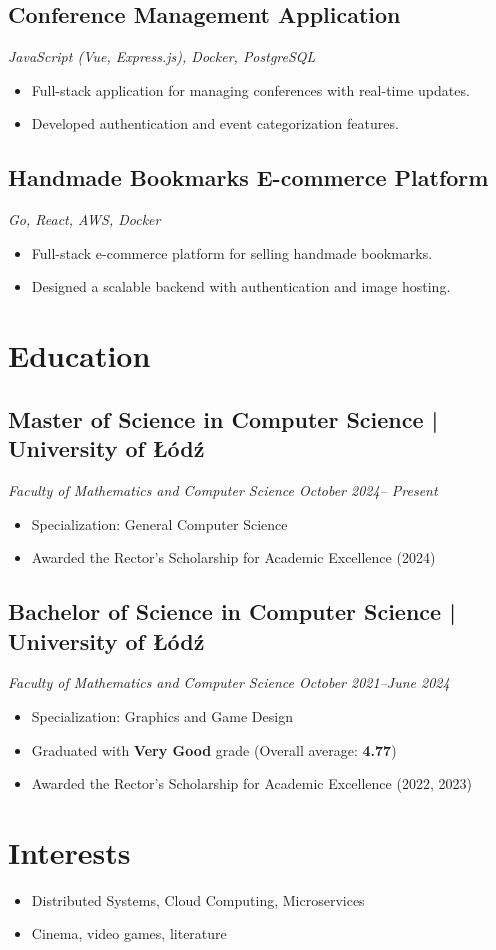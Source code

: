 \documentclass[a4paper,10pt]{article}
\begin{document}
\subsection{Conference Management Application}
\textit{JavaScript (Vue, Express.js), Docker, PostgreSQL}
\begin{itemize}[leftmargin=0.5cm, nosep]
    \item Full-stack application for managing conferences with real-time updates.
    \item Developed authentication and event categorization features.
\end{itemize}

\subsection{Handmade Bookmarks E-commerce Platform}
\textit{Go, React, AWS, Docker}
\begin{itemize}[leftmargin=0.5cm, nosep]
    \item Full-stack e-commerce platform for selling handmade bookmarks.
    \item Designed a scalable backend with authentication and image hosting.
\end{itemize}

\section{Education}

\subsection{Master of Science in Computer Science | University of Łódź}
\textit{Faculty of Mathematics and Computer Science \hfill October 2024-- Present}
\begin{itemize}[leftmargin=0.5cm, nosep]
  \item Specialization: General Computer Science
  \item Awarded the Rector's Scholarship for Academic Excellence (2024)
\end{itemize}

\subsection{Bachelor of Science in Computer Science | University of Łódź}
\textit{Faculty of Mathematics and Computer Science \hfill October 2021--June 2024}
\begin{itemize}[leftmargin=0.5cm, nosep]
  \item Specialization: Graphics and Game Design
  \item Graduated with \textbf{Very Good} grade (Overall average: \textbf{4.77})
  \item Awarded the Rector's Scholarship for Academic Excellence (2022, 2023)
\end{itemize}

\section{Interests}
\begin{itemize}[leftmargin=0.5cm, nosep]
    \item Distributed Systems, Cloud Computing, Microservices
    \item Cinema, video games, literature
\end{itemize}
\end{document}
